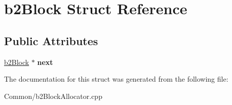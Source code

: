 \hypertarget{structb2Block}{}\section{b2\+Block Struct Reference}
\label{structb2Block}
\subsection*{Public Attributes}
\begin{DoxyCompactItemize}
\item 
\mbox{\label{structb2Block_a4b410d4fd7ad2a117c70776f60cb2738}} 
\mbox{\hyperlink{structb2Block}{b2\+Block}} $\ast$ {\bfseries next}
\end{DoxyCompactItemize}


The documentation for this struct was generated from the following file\+:\begin{DoxyCompactItemize}
\item 
Common/b2\+Block\+Allocator.\+cpp\end{DoxyCompactItemize}
